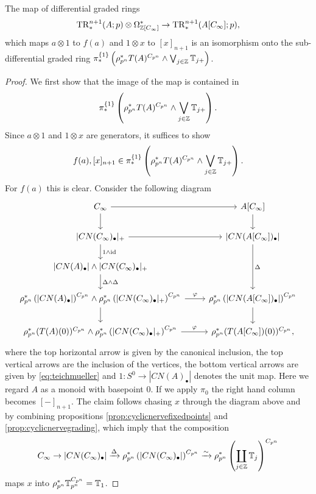 %
%
\begin{lem}
The map of differential graded rings
\[
\mathrm{TR}^{n+1}_\ast(A;p)\otimes \Omega^\ast_{\mathbb{Z}[C_\infty]}\rightarrow 
\mathrm{TR}^{n+1}_\ast(A[C_{\infty}];p),
\]
which maps $a\otimes 1$ to $f(a)$ and $1\otimes x$ to  $[x]_{n+1}$ is an isomorphism onto the
sub-differential graded ring $ \pi_\ast^{\{1\}}\left(
\rho_{p^n}^\ast T(A) ^{ C_{ p^n } }
\wedge 
\bigvee_{j \in \mathbb{Z}}\mathbb{T}_{j+}\right)$.
\end{lem}
\begin{proof}
We first show that the image of the map is contained in 
\[
 \pi_\ast^{\{1\}}\left(
\rho_{p^n}^\ast  T(A) ^{ C_{ p^n } }
\wedge 
\bigvee_{j \in \mathbb{Z}}\mathbb{T}_{j+}\right).
\]
 Since $a \otimes 1$ and $1 \otimes x $
are generators, it suffices to show 
\[
f(a),  [x]_{n+1}  \in 
 \pi_\ast^{\{1\}}\left(
\rho_{p^n}^\ast  T(A)^{ C_{ p^n } }
\wedge 
\bigvee_{j \in \mathbb{Z}}\mathbb{T}_{j+}\right).
\]
For $f(a)$ this is clear. Consider the following diagram
\[
\begin{tikzcd}
C_\infty\arrow{r}\arrow{d}
&A[C_\infty]\arrow{d}\\
\lvert CN(C_\infty)_\bullet\rvert_+
\arrow{r}\arrow{d}{1\wedge\mathrm{id}}
&\lvert CN(A[C_\infty])_\bullet\rvert
\arrow{dd}{\Delta}\\
\lvert CN(A)_\bullet \rvert\wedge\lvert CN(C_\infty)_\bullet \rvert_+
\arrow{d}{\Delta\wedge \Delta}
\\
\rho_{p^n}^\ast \left( \lvert CN(A)_\bullet \rvert\right)^{C_{p^n}}\wedge
\rho_{p^n}^\ast \left(\lvert CN(C_\infty)_\bullet \rvert_+\right)^{C_{p^n}}
\arrow{r}{\varphi}\arrow{d}
& \rho_{p^n}^\ast \left( \lvert CN(A[C_\infty])_\bullet\rvert\right)^{C_{p^n}}
\arrow{d}\\
\rho_{p^n}^\ast (T(A)(0))^{C_{p^n}} \wedge
\rho_{p^n}^\ast \left(\lvert CN(C_\infty)_\bullet \rvert_+\right)^{C_{p^n}}
\arrow{r}{\varphi}
&\rho_{p^n}^\ast (T(A[C_\infty])(0))^{C_{p^n}},
\end{tikzcd}
\]
where the top horizontal arrow is given by the canonical inclusion, the top vertical
arrows are the inclusion of the vertices, the bottom vertical arrows are given
by \eqref{eq:teichmueller} and $1:S^0\to |CN(A)_\bullet|$ denotes
the unit map. Here we regard $A$ as a monoid with basepoint $0$.
If we apply $\pi_0$ the right hand column becomes $[-]_{n+1}$. The claim
follows chasing $x$ through the diagram above and by combining propositions \ref{prop:cyclicnervefixedpoints}
and \ref{prop:cyclicnervegrading}, which imply that the composition
\[
C_\infty\to |CN(C_\infty)_\bullet| \xrightarrow{\Delta}
\rho_{p^n}^\ast \left( \lvert CN(C_\infty)_\bullet \rvert\right)^{C_{p^n}}
\xrightarrow{\sim} \rho_{p^n}^\ast \left(\coprod_{j\in \mathbb{Z}}\mathbb{T}_j\right)^{C_{p^n}}
\]
maps $x$
into $\rho_{p^n}^\ast \mathbb{T}_{p^n}^{C_{p^n}} = \mathbb{T}_1$.


\end{proof}
